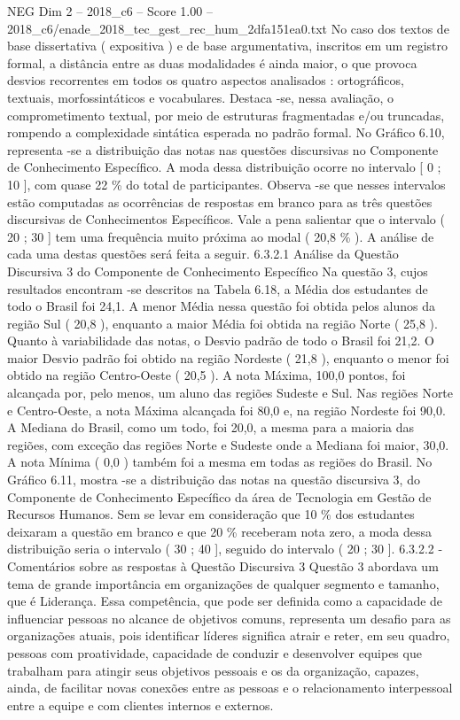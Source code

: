 \begin{textsample}{NEG Dim 2 – 2018\_c6 – Score 1.00 – 2018\_c6/enade\_2018\_tec\_gest\_rec\_hum\_2dfa151ea0.txt}
No caso dos textos de base dissertativa ( expositiva ) e de base argumentativa, inscritos em um registro formal, a distância entre as duas modalidades é ainda maior, o que provoca desvios recorrentes em todos os quatro aspectos analisados : ortográficos, textuais, morfossintáticos e vocabulares.
Destaca -se, nessa avaliação, o comprometimento textual, por meio de estruturas fragmentadas e/ou truncadas, rompendo a complexidade sintática esperada no padrão formal.
No Gráfico 6.10, representa -se a distribuição das notas nas questões discursivas no Componente de Conhecimento Específico.
A moda dessa distribuição ocorre no intervalo [ 0 ; 10 ], com quase 22 \% do total de participantes.
Observa -se que nesses intervalos estão computadas as ocorrências de respostas em branco para as três questões discursivas de Conhecimentos Específicos.
Vale a pena salientar que o intervalo ( 20 ; 30 ] tem uma frequência muito próxima ao modal ( 20,8 \% ).
A análise de cada uma destas questões será feita a seguir. 6.3.2.1 Análise da Questão Discursiva 3 do Componente de Conhecimento Específico Na questão 3, cujos resultados encontram -se descritos na Tabela 6.18, a Média dos estudantes de todo o Brasil foi 24,1.
A menor Média nessa questão foi obtida pelos alunos da região Sul ( 20,8 ), enquanto a maior Média foi obtida na região Norte ( 25,8 ).
Quanto à variabilidade das notas, o Desvio padrão de todo o Brasil foi 21,2.
O maior Desvio padrão foi obtido na região Nordeste ( 21,8 ), enquanto o menor foi obtido na região Centro-Oeste ( 20,5 ).
A nota Máxima, 100,0 pontos, foi alcançada por, pelo menos, um aluno das regiões Sudeste e Sul.
Nas regiões Norte e Centro-Oeste, a nota Máxima alcançada foi 80,0 e, na região Nordeste foi 90,0.
A Mediana do Brasil, como um todo, foi 20,0, a mesma para a maioria das regiões, com exceção das regiões Norte e Sudeste onde a Mediana foi maior, 30,0.
A nota Mínima ( 0,0 ) também foi a mesma em todas as regiões do Brasil.
No Gráfico 6.11, mostra -se a distribuição das notas na questão discursiva 3, do Componente de Conhecimento Específico da área de Tecnologia em Gestão de Recursos Humanos.
Sem se levar em consideração que 10 \% dos estudantes deixaram a questão em branco e que 20 \% receberam nota zero, a moda dessa distribuição seria o intervalo ( 30 ; 40 ], seguido do intervalo ( 20 ; 30 ]. 6.3.2.2 - Comentários sobre as respostas à Questão Discursiva 3 Questão 3 abordava um tema de grande importância em organizações de qualquer segmento e tamanho, que é Liderança.
Essa competência, que pode ser definida como a capacidade de influenciar pessoas no alcance de objetivos comuns, representa um desafio para as organizações atuais, pois identificar líderes significa atrair e reter, em seu quadro, pessoas com proatividade, capacidade de conduzir e desenvolver equipes que trabalham para atingir seus objetivos pessoais e os da organização, capazes, ainda, de facilitar novas conexões entre as pessoas e o relacionamento interpessoal entre a equipe e com clientes internos e externos.

\end{textsample}
